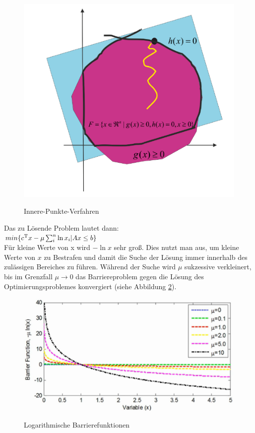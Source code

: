 \documentclass{like}
\begin{document}
  \begin{figure}[ht!]
  	\caption{Innere-Punkte-Verfahren}
  	\includegraphics[width=350pt]{Abbildungen/iterPoint.png}
  	\label{fig:iterPoint}
  \end{figure}
 
 Das zu Lösende Problem lautet dann: \\
 $min \{ c\textsuperscript{T}x - \mu \sum_{i}^{n} \ln x_i | Ax \leq b\}$ \\
 Für kleine Werte von x wird $-\ln x $ sehr groß. Dies nutzt man aus, um kleine Werte von \(x\) zu Bestrafen und damit die Suche der Lösung immer innerhalb des zulässigen Bereiches zu führen. Während der Suche wird \(\mu\) sukzessive verkleinert, bis im Grenzfall $ \mu \rightarrow 0$ das Barriereproblem gegen die Lösung des Optimierungsproblemes konvergiert (siehe Abbildung \ref{fig:iterPointLn}).\\
   
   \begin{figure}[ht!]
   	\caption{Logarithmische Barrierefunktionen}
   	\includegraphics[width=350pt]{Abbildungen/intPointLn.png}
   	\label{fig:iterPointLn}
   \end{figure}
 
\end{document}
